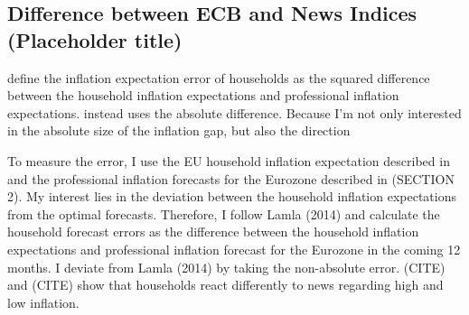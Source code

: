 \documentclass[review]{elsarticle}
\begin{document}
\newpage

\subsection{Difference between ECB and News Indices (Placeholder title)}\label{sec:Difference between ECB and News Indices (Placeholder title)}

\cite{Carroll2003} define the inflation expectation error of households as the squared difference between the household inflation expectations and professional inflation expectations. \cite{LamlaLein2014} instead uses the absolute difference. Because I'm not only interested in the absolute size of the inflation gap, but also the direction 

To measure the error, I use the EU household inflation expectation described in and the professional inflation forecasts for the Eurozone described in (SECTION 2). My interest lies in the deviation between the household inflation expectations from the optimal forecasts. Therefore, I follow Lamla (2014) and calculate the household forecast errors as the difference between the household inflation expectations and professional inflation forecast for the Eurozone in the coming 12 months. I deviate from Lamla (2014) by taking the non-absolute error. (CITE) and (CITE) show that households react differently to news regarding high and low inflation.

\newpage
\end{document}
